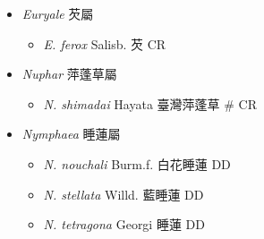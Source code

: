 
  \begin{itemize}
 \item[] \textit{Euryale} 芡屬
                                
  \begin{itemize}
        \item[] \textit{E. ferox} Salisb.  芡   CR
  \end{itemize}
 \item[] \textit{Nuphar} 萍蓬草屬
                                
  \begin{itemize}
        \item[] \textit{N. shimadai} Hayata  臺灣萍蓬草  \# CR
  \end{itemize}
 \item[] \textit{Nymphaea} 睡蓮屬
                                
  \begin{itemize}
        \item[] \textit{N. nouchali} Burm.f.  白花睡蓮   DD
        \item[] \textit{N. stellata} Willd.  藍睡蓮   DD
        \item[] \textit{N. tetragona} Georgi  睡蓮   DD
  \end{itemize}
  \end{itemize}
